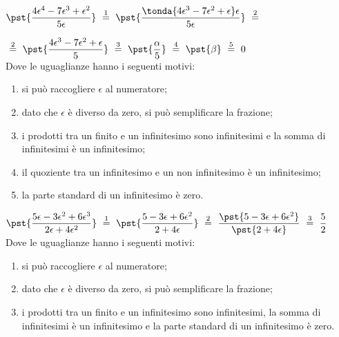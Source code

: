 \begin{esempio}

\(\pst{\dfrac{4 \epsilon^4 -7 \epsilon^3 + \epsilon^2}{5 \epsilon}} 
~ \stackrel{1}{=} ~
  \pst{\dfrac{\tonda{4 \epsilon^3 -7 \epsilon^2 + \epsilon} \epsilon}
                    {5 \epsilon}} 
~ \stackrel{2}{=} ~\)

\(~ \stackrel{2}{=} ~ 
  \pst{\dfrac{4 \epsilon^3 -7 \epsilon^2 + \epsilon}{5}} 
~ \stackrel{3}{=} ~
  \pst{\dfrac{\alpha}{5}}
~ \stackrel{4}{=} ~
  \pst{\beta}
~ \stackrel{5}{=} ~
  0\)\\

Dove le uguaglianze hanno i seguenti motivi:
\begin{enumerate} [nosep]
 \item si può raccogliere \(\epsilon\) al numeratore; 
 \item dato che \(\epsilon\) è diverso da zero, si può semplificare la 
frazione; 
 \item i prodotti tra un finito e un infinitesimo sono infinitesimi e la 
somma 
di infinitesimi è un infinitesimo;
 \item il quoziente tra un infinitesimo e un non infinitesimo è un 
infinitesimo;
 \item la parte standard di un infinitesimo è zero.
\end{enumerate}
\end{esempio}

\begin{esempio}

\(\pst{\dfrac{5\epsilon -3 \epsilon^2 + 6 \epsilon^3}
             {2\epsilon + 4 \epsilon^2}} 
~ \stackrel{1}{=} ~
  \pst{\dfrac{5 -3 \epsilon + 6 \epsilon^2}
             {2 + 4 \epsilon}} 
~ \stackrel{2}{=} ~
  \dfrac{\pst{5 -3 \epsilon + 6 \epsilon^2}}
             {\pst{2 + 4 \epsilon}} 
~ \stackrel{3}{=} ~
  \dfrac{5}{2}\)\\

Dove le uguaglianze hanno i seguenti motivi:
\begin{enumerate} [nosep]
 \item si può raccogliere \(\epsilon\) al numeratore; 
 \item dato che \(\epsilon\) è diverso da zero, si può semplificare la 
frazione; 
 \item i prodotti tra un finito e un infinitesimo sono infinitesimi, la somma 
di infinitesimi è un infinitesimo e la parte standard di un infinitesimo è 
zero.
\end{enumerate}
\end{esempio}


